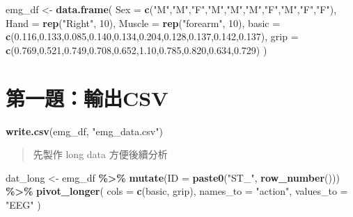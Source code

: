 \documentclass[
  12pt,
]{article}
\newenvironment{Shaded}{\begin{snugshade}}{\end{snugshade}}
\newcommand{\AttributeTok}[1]{\textcolor[rgb]{0.13,0.29,0.53}{#1}}
\newcommand{\DecValTok}[1]{\textcolor[rgb]{0.00,0.00,0.81}{#1}}
\newcommand{\FloatTok}[1]{\textcolor[rgb]{0.00,0.00,0.81}{#1}}
\newcommand{\FunctionTok}[1]{\textcolor[rgb]{0.13,0.29,0.53}{\textbf{#1}}}
\newcommand{\NormalTok}[1]{#1}
\newcommand{\OtherTok}[1]{\textcolor[rgb]{0.56,0.35,0.01}{#1}}
\newcommand{\SpecialCharTok}[1]{\textcolor[rgb]{0.81,0.36,0.00}{\textbf{#1}}}
\newcommand{\StringTok}[1]{\textcolor[rgb]{0.31,0.60,0.02}{#1}}
\begin{document}
\begin{Shaded}
\begin{Highlighting}[]
\NormalTok{emg\_df }\OtherTok{\textless{}{-}} \FunctionTok{data.frame}\NormalTok{(}
  \AttributeTok{Sex    =} \FunctionTok{c}\NormalTok{(}\StringTok{"M"}\NormalTok{,}\StringTok{"M"}\NormalTok{,}\StringTok{"F"}\NormalTok{,}\StringTok{"M"}\NormalTok{,}\StringTok{"M"}\NormalTok{,}\StringTok{"M"}\NormalTok{,}\StringTok{"F"}\NormalTok{,}\StringTok{"M"}\NormalTok{,}\StringTok{"F"}\NormalTok{,}\StringTok{"F"}\NormalTok{),}
  \AttributeTok{Hand   =} \FunctionTok{rep}\NormalTok{(}\StringTok{"Right"}\NormalTok{, }\DecValTok{10}\NormalTok{),}
  \AttributeTok{Muscle =} \FunctionTok{rep}\NormalTok{(}\StringTok{"forearm"}\NormalTok{, }\DecValTok{10}\NormalTok{),}
  \AttributeTok{basic  =} \FunctionTok{c}\NormalTok{(}\FloatTok{0.116}\NormalTok{,}\FloatTok{0.133}\NormalTok{,}\FloatTok{0.085}\NormalTok{,}\FloatTok{0.140}\NormalTok{,}\FloatTok{0.134}\NormalTok{,}\FloatTok{0.204}\NormalTok{,}\FloatTok{0.128}\NormalTok{,}\FloatTok{0.137}\NormalTok{,}\FloatTok{0.142}\NormalTok{,}\FloatTok{0.137}\NormalTok{),}
  \AttributeTok{grip   =} \FunctionTok{c}\NormalTok{(}\FloatTok{0.769}\NormalTok{,}\FloatTok{0.521}\NormalTok{,}\FloatTok{0.749}\NormalTok{,}\FloatTok{0.708}\NormalTok{,}\FloatTok{0.652}\NormalTok{,}\FloatTok{1.10}\NormalTok{,}\FloatTok{0.785}\NormalTok{,}\FloatTok{0.820}\NormalTok{,}\FloatTok{0.634}\NormalTok{,}\FloatTok{0.729}\NormalTok{)}
\NormalTok{)}
\end{Highlighting}
\end{Shaded}

\section{第一題：輸出CSV}\label{ux7b2cux4e00ux984cux8f38ux51facsv}

\begin{Shaded}
\begin{Highlighting}[]
\FunctionTok{write.csv}\NormalTok{(emg\_df, }\StringTok{"emg\_data.csv"}\NormalTok{)}
\end{Highlighting}
\end{Shaded}

\begin{quote}
先製作 long data 方便後續分析
\end{quote}

\begin{Shaded}
\begin{Highlighting}[]
\NormalTok{dat\_long }\OtherTok{\textless{}{-}}\NormalTok{ emg\_df }\SpecialCharTok{\%\textgreater{}\%}
  \FunctionTok{mutate}\NormalTok{(}\AttributeTok{ID =} \FunctionTok{paste0}\NormalTok{(}\StringTok{"ST\_"}\NormalTok{, }\FunctionTok{row\_number}\NormalTok{())) }\SpecialCharTok{\%\textgreater{}\%}
  \FunctionTok{pivot\_longer}\NormalTok{(}
    \AttributeTok{cols      =} \FunctionTok{c}\NormalTok{(basic, grip),}
    \AttributeTok{names\_to  =} \StringTok{"action"}\NormalTok{,}
    \AttributeTok{values\_to =} \StringTok{"EEG"}
\NormalTok{  )}
\end{Highlighting}
\end{Shaded}
\end{document}
